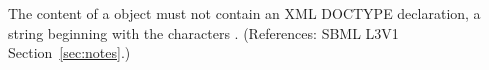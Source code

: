 The content of a \Notes object must not contain an XML
DOCTYPE declaration, \ie a string beginning with the characters
.  (References: SBML L3V1 Section~\ref{sec:notes}.)

